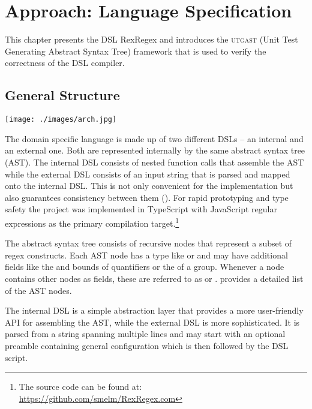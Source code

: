 \chapter{Approach: Language Specification}

This chapter presents the DSL RexRegex and introduces the \textsc{utgast} (Unit Test Generating Abstract Syntax Tree) framework that is used to verify the correctness of the DSL compiler.

\section{General Structure}

\begin{boxFigure}[title={Stages of compilation},label=fig:stagesOfCompilation]
\texttt{[image: ./images/arch.jpg]}
\end{boxFigure}

The domain specific language is made up of two different DSLs -- an internal and an external one. Both are represented internally by the same abstract syntax tree (AST). The internal DSL consists of nested function calls that assemble the AST while the external DSL consists of an input string that is parsed and mapped onto the internal DSL. This is not only convenient for the implementation but also guarantees consistency between them (). For rapid prototyping and type safety the project was implemented in TypeScript with JavaScript regular expressions as the primary compilation target.\footnote{The source code can be found at: \url{https://github.com/smelm/RexRegex.com}} 

The abstract syntax tree consists of recursive nodes that represent a subset of regex constructs. Each AST node has a type like  or  and may have additional fields like the  and  bounds of quantifiers or the  of a group. Whenever a node contains other nodes as fields, these are referred to as  or .  provides a detailed list of the AST nodes.

The internal DSL is a simple abstraction layer that provides a more user-friendly API for assembling the AST, while the external DSL is more sophisticated. It is parsed from a string spanning multiple lines and may start with an optional preamble containing general configuration which is then followed by the DSL script.

